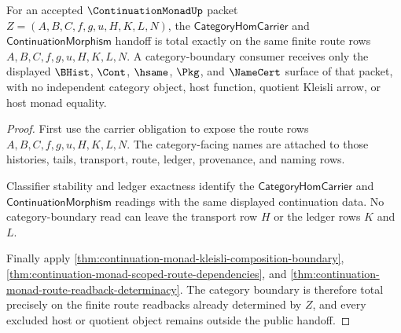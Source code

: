 \begin{theorem}
\label{thm:continuation-monad-category-boundary-readback-totality}
For an accepted $\ContinuationMonadUp$ packet $Z=(A,B,C,f,g,u,H,K,L,N)$, the $\mathsf{CategoryHomCarrier}$ and $\mathsf{ContinuationMorphism}$ handoff is total exactly on the same finite route rows $A,B,C,f,g,u,H,K,L,N$. A category-boundary consumer receives only the displayed $\BHist$, $\Cont$, $\hsame$, $\Pkg$, and $\NameCert$ surface of that packet, with no independent category object, host function, quotient Kleisli arrow, or host monad equality.
\end{theorem}
\begin{proof}
First use the carrier obligation to expose the route rows $A,B,C,f,g,u,H,K,L,N$. The category-facing names are attached to those histories, tails, transport, route, ledger, provenance, and naming rows.

Classifier stability and ledger exactness identify the $\mathsf{CategoryHomCarrier}$ and $\mathsf{ContinuationMorphism}$ readings with the same displayed continuation data. No category-boundary read can leave the transport row $H$ or the ledger rows $K$ and $L$.

Finally apply \autoref{thm:continuation-monad-kleisli-composition-boundary}, \autoref{thm:continuation-monad-scoped-route-dependencies}, and \autoref{thm:continuation-monad-route-readback-determinacy}. The category boundary is therefore total precisely on the finite route readbacks already determined by $Z$, and every excluded host or quotient object remains outside the public handoff.
\end{proof}

